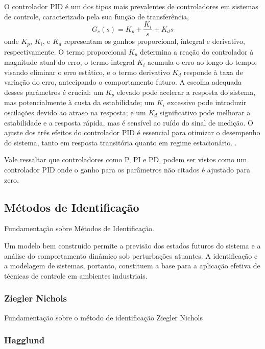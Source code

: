 O controlador PID é um dos tipos mais prevalentes de controladores em sistemas de controle, caracterizado pela sua
função de transferência,
\begin{equation}
\label{eq:ctrlr}
G_c(s) = K_p + \frac{K_i}{s} + K_d s
\end{equation}
onde \( K_p \), \( K_i \), e \( K_d \) representam os ganhos proporcional, integral e derivativo, respectivamente.
O termo proporcional \( K_p \) determina a reação do controlador à magnitude atual do erro,
o termo integral \( K_i \) acumula o erro ao longo do tempo, visando eliminar o erro estático,
e o termo derivativo \( K_d \) responde à taxa de variação do erro, antecipando o comportamento futuro.
A escolha adequada desses parâmetros é crucial: um \( K_p \) elevado pode acelerar a resposta do sistema, mas
potencialmente à custa da estabilidade;
um \( K_i \) excessivo pode introduzir oscilações devido ao atraso na resposta;
e um \( K_d \) significativo pode melhorar a estabilidade e a resposta rápida, mas é sensível ao ruído do sinal de
medição.
O ajuste dos três efeitos do controlador PID é essencial para otimizar o desempenho do sistema, tanto em resposta
transitória quanto em regime estacionário. \cite[Cap 2.3 e 8]{ogata2010engenharia}.

Vale ressaltar que controladores como P, PI e PD, podem ser vistos como um controlador PID onde o ganho para os
parâmetros não citados é ajustado para zero.

\subsection{Métodos de Identificação}

Fundamentação sobre Métodos de Identificação.

Um modelo bem construído permite a previsão dos estados futuros do sistema e a análise do comportamento dinâmico sob
perturbações atuantes.
A identificação e a modelagem de sistemas, portanto, constituem a base para a aplicação efetiva de técnicas de controle
em ambientes industriais.

\subsubsection{Ziegler Nichols}

Fundamentação sobre o método de identificação Ziegler Nichols

\subsubsection{Hagglund}

